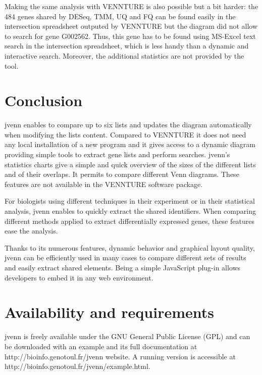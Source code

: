 \documentclass{bmcart}
\begin{document}
Making the same analysis with VENNTURE is also possible but a bit harder: the 
484 genes shared by DESeq, TMM, UQ and FQ can be found easily in the 
intersection spreadsheet outputed by VENNTURE but the diagram did not allow
to search for gene G002562. Thus, this gene has to be found using MS-Excel text 
search in the intersection spreadsheet, which is less handy than a dynamic and 
interactive search. Moreover, the additional statistics are not provided by the
tool.


\section*{Conclusion}

jvenn enables to compare up to six lists and updates the diagram automatically
when modifying the lists content. Compared to VENNTURE it does not need any 
local installation of a new program and it gives access to a dynamic diagram 
providing simple tools to extract gene lists and perform searches. 
jvenn's statistics charts give a simple and quick overview of the sizes of the
different lists and of their overlaps. It permits to compare different Venn
diagrams. These features are not available in the VENNTURE software package.

For biologists using different techniques in their experiment or in their
statistical analysis, jvenn enables to quickly extract the shared identifiers.
When comparing different methods applied to extract differentially expressed
genes, these features ease the analysis.

Thanks to its numerous features, dynamic behavior and graphical layout quality,
jvenn can be efficiently used in many cases to compare different sets of results
and easily extract shared elements. Being a simple JavaScript plug-in allows
developers to embed it in any web environment.


\section*{Availability and requirements}

jvenn is freely available under the GNU General Public License (GPL) and can be
downloaded with an example and its full documentation at
http://bioinfo.genotoul.fr/jvenn  website. A running version is accessible at
http://bioinfo.genotoul.fr/jvenn/example.html.

\end{document}
